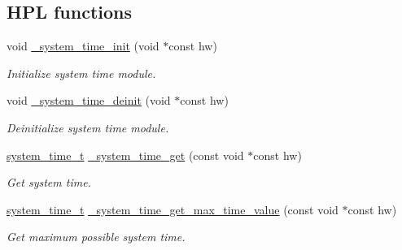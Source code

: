 \subsection*{H\+PL functions}
\begin{DoxyCompactItemize}
\item 
void \hyperlink{group___h_p_l_gafa42a76bae0892be69f99fad9ad2f312}{\+\_\+system\+\_\+time\+\_\+init} (void $\ast$const hw)
\begin{DoxyCompactList}\small\item\em Initialize system time module. \end{DoxyCompactList}\item 
void \hyperlink{group___h_p_l_ga7bd979fd9280b6f1d630f2afa36aa3e5}{\+\_\+system\+\_\+time\+\_\+deinit} (void $\ast$const hw)
\begin{DoxyCompactList}\small\item\em Deinitialize system time module. \end{DoxyCompactList}\item 
\hyperlink{group___h_p_l_ga5885ba48297c95f5c8a108cfa02e6e55}{system\+\_\+time\+\_\+t} \hyperlink{group___h_p_l_gaef21251348cfac8ea881d7927a678fc7}{\+\_\+system\+\_\+time\+\_\+get} (const void $\ast$const hw)
\begin{DoxyCompactList}\small\item\em Get system time. \end{DoxyCompactList}\item 
\hyperlink{group___h_p_l_ga5885ba48297c95f5c8a108cfa02e6e55}{system\+\_\+time\+\_\+t} \hyperlink{group___h_p_l_gac4972d67e3648ca8a51181ce8fc6e616}{\+\_\+system\+\_\+time\+\_\+get\+\_\+max\+\_\+time\+\_\+value} (const void $\ast$const hw)
\begin{DoxyCompactList}\small\item\em Get maximum possible system time. \end{DoxyCompactList}\end{DoxyCompactItemize}
